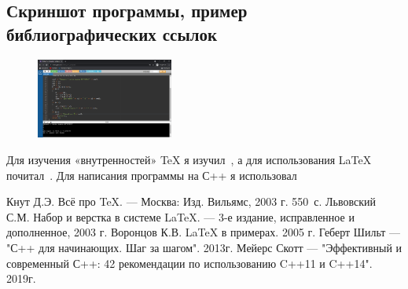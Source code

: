 \documentclass[12pt,a4paper]{scrartcl}
\begin{document}
\subsection{Скриншот программы, пример библиографических ссылок}
\label{sec:picexample}

\begin{figure}[h]
	\centering
	\includegraphics[width=0.4\textwidth]{ScreenOfProgramm.PNG}
\end{figure}

Для изучения «внутренностей» \TeX{} я 
изучил~\cite{Knuth-2003}, а для использования \LaTeX{}
почитал~\cite{Lvovsky-2003, Voroncov-2005}. Для написания программы на С++ я использовал \cite{Herbert-2013, Scott-2019}


\begin{thebibliography}{9}
Кнут Д.Э. Всё про \TeX. \newblock --- Москва: Изд. Вильямс, 2003 г. 550~с.
Львовский С.М. Набор и верстка в системе \LaTeX{}. \newblock --- 3-е издание, исправленное и дополненное, 2003 г.
Воронцов К.В. \LaTeX{} в примерах. 2005 г.
Геберт Шильт --- "С++ для начинающих. Шаг за шагом". 2013г.
Мейерс Скотт --- "Эффективный и современный С++: 42 рекомендации по использованию C++11 и C++14". 2019г.
\end{thebibliography}
\end{document}
